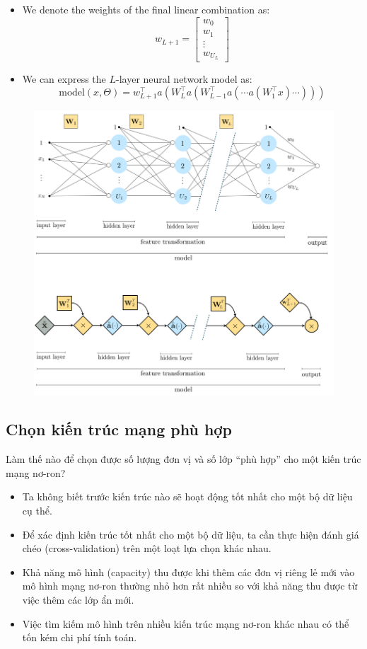 \documentclass{book}
\begin{document}
    \begin{itemize}
        \item We denote the weights of the final linear combination as:
        \[
        w_{L+1} =
        \begin{bmatrix}
        w_0 \\
        w_1 \\
        \vdots \\
        w_{U_L}
        \end{bmatrix}
        \]
        \item We can express the $L$-layer neural network model as:
        \[
        \text{model}(x, \Theta) = w_{L+1}^\top a\left(W_L^\top a\left(W_{L-1}^\top a\left(\cdots a\left(W_1^\top x\right)\cdots \right)\right)\right)
        \]
    \end{itemize}
    \begin{figure}[H]
        \centering
        \includegraphics[width=0.8\linewidth]{images/general-model1.png}
        \label{fig:general-model1}
    \end{figure}
    \subsection{Chọn kiến trúc mạng phù hợp}

    Làm thế nào để chọn được số lượng đơn vị và số lớp “phù hợp” cho một kiến trúc mạng nơ-ron?
    
    \begin{itemize}
        \item Ta không biết trước kiến trúc nào sẽ hoạt động tốt nhất cho một bộ dữ liệu cụ thể.
        \item Để xác định kiến trúc tốt nhất cho một bộ dữ liệu, ta cần thực hiện đánh giá chéo (cross-validation) trên một loạt lựa chọn khác nhau.
        \item Khả năng mô hình (capacity) thu được khi thêm các đơn vị riêng lẻ mới vào mô hình mạng nơ-ron thường nhỏ hơn rất nhiều so với khả năng thu được từ việc thêm các lớp ẩn mới.
        \item Việc tìm kiếm mô hình trên nhiều kiến trúc mạng nơ-ron khác nhau có thể tốn kém chi phí tính toán.
    \end{itemize}
\end{document}
